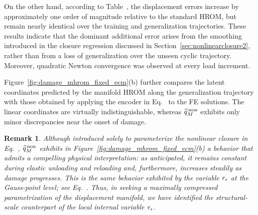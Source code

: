 \documentclass[preprint,10pt]{elsarticle}  %
\newtheorem{remark}{Remark}
\begin{document}
On the other hand, according to Table~, the displacement errors increase by approximately one order of
magnitude relative to the standard HROM, but remain nearly identical
over the training and generalization trajectories. These results
indicate that the dominant additional error arises from the smoothing
introduced in the closure regression discussed in Section~\ref{sec:nonlinearclosure2}, rather
than from a loss of generalization over the unseen cyclic trajectory. Moreover, quadratic
Newton convergence was observed at every load increment.

Figure~\ref{fig:damage_mhrom_fixed_ecm}(b) further compares the latent
coordinates predicted by the manifold HROM along the generalization
trajectory with those obtained by applying the encoder in
Eq.~ to the FE solutions. The linear
coordinates are virtually indistinguishable, whereas
\(\widehat{q}^{\mathrm{\,non}}_{M}\) exhibits only minor discrepancies near the onset of
damage.



\begin{remark}
\label{remark:interpretation}
Although introduced solely to parameterize the nonlinear closure in Eq.~,
\(\widehat{q}^{\mathrm{\,non}}_{M}\) exhibits in
Figure~\ref{fig:damage_mhrom_fixed_ecm}(b) a behavior that admits a
compelling physical interpretation: as anticipated, it remains constant
during elastic unloading and reloading and, furthermore, increases
steadily as damage progresses. This is the same behavior exhibited by
the variable \(r_{\epsilon}\) at the Gauss-point level; see
Eq.~. Thus, in seeking a maximally
compressed parametrization of the displacement manifold, we have
identified the structural-scale counterpart of the local internal
variable \(r_{\epsilon}\).
\end{remark}
\end{document}
